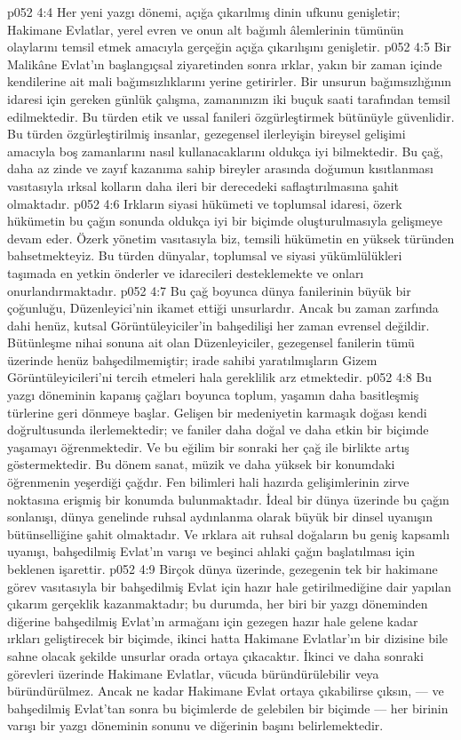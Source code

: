\vs p052 4:4 Her yeni yazgı dönemi, açığa çıkarılmış dinin ufkunu genişletir; Hakimane Evlatlar, yerel evren ve onun alt bağımlı âlemlerinin tümünün olaylarını temsil etmek amacıyla gerçeğin açığa çıkarılışını genişletir.
\vs p052 4:5 Bir Malikâne Evlat’ın başlangıçsal ziyaretinden sonra ırklar, yakın bir zaman içinde kendilerine ait mali bağımsızlıklarını yerine getirirler. Bir unsurun bağımsızlığının idaresi için gereken günlük çalışma, zamanınızın iki buçuk saati tarafından temsil edilmektedir. Bu türden etik ve ussal fanileri özgürleştirmek bütünüyle güvenlidir. Bu türden özgürleştirilmiş insanlar, gezegensel ilerleyişin bireysel gelişimi amacıyla boş zamanlarını nasıl kullanacaklarını oldukça iyi bilmektedir. Bu çağ, daha az zinde ve zayıf kazanıma sahip bireyler arasında doğumun kısıtlanması vasıtasıyla ırksal kolların daha ileri bir derecedeki saflaştırılmasına şahit olmaktadır.
\vs p052 4:6 Irkların siyasi hükümeti ve toplumsal idaresi, özerk hükümetin bu çağın sonunda oldukça iyi bir biçimde oluşturulmasıyla gelişmeye devam eder. Özerk yönetim vasıtasıyla biz, temsili hükümetin en yüksek türünden bahsetmekteyiz. Bu türden dünyalar, toplumsal ve siyasi yükümlülükleri taşımada en yetkin önderler ve idarecileri desteklemekte ve onları onurlandırmaktadır.
\vs p052 4:7 Bu çağ boyunca dünya fanilerinin büyük bir çoğunluğu, Düzenleyici’nin ikamet ettiği unsurlardır. Ancak bu zaman zarfında dahi henüz, kutsal Görüntüleyiciler’in bahşedilişi her zaman evrensel değildir. Bütünleşme nihai sonuna ait olan Düzenleyiciler, gezegensel fanilerin tümü üzerinde henüz bahşedilmemiştir; irade sahibi yaratılmışların Gizem Görüntüleyicileri’ni tercih etmeleri hala gereklilik arz etmektedir.
\vs p052 4:8 Bu yazgı döneminin kapanış çağları boyunca toplum, yaşamın daha basitleşmiş türlerine geri dönmeye başlar. Gelişen bir medeniyetin karmaşık doğası kendi doğrultusunda ilerlemektedir; ve faniler daha doğal ve daha etkin bir biçimde yaşamayı öğrenmektedir. Ve bu eğilim bir sonraki her çağ ile birlikte artış göstermektedir. Bu dönem sanat, müzik ve daha yüksek bir konumdaki öğrenmenin yeşerdiği çağdır. Fen bilimleri hali hazırda gelişimlerinin zirve noktasına erişmiş bir konumda bulunmaktadır. İdeal bir dünya üzerinde bu çağın sonlanışı, dünya genelinde ruhsal aydınlanma olarak büyük bir dinsel uyanışın bütünselliğine şahit olmaktadır. Ve ırklara ait ruhsal doğaların bu geniş kapsamlı uyanışı, bahşedilmiş Evlat’ın varışı ve beşinci ahlaki çağın başlatılması için beklenen işarettir.
\vs p052 4:9 Birçok dünya üzerinde, gezegenin tek bir hakimane görev vasıtasıyla bir bahşedilmiş Evlat için hazır hale getirilmediğine dair yapılan çıkarım gerçeklik kazanmaktadır; bu durumda, her biri bir yazgı döneminden diğerine bahşedilmiş Evlat’ın armağanı için gezegen hazır hale gelene kadar ırkları geliştirecek bir biçimde, ikinci hatta Hakimane Evlatlar’ın bir dizisine bile sahne olacak şekilde unsurlar orada ortaya çıkacaktır. İkinci ve daha sonraki görevleri üzerinde Hakimane Evlatlar, vücuda büründürülebilir veya büründürülmez. Ancak ne kadar Hakimane Evlat ortaya çıkabilirse çıksın, --- ve bahşedilmiş Evlat’tan sonra bu biçimlerde de gelebilen bir biçimde --- her birinin varışı bir yazgı döneminin sonunu ve diğerinin başını belirlemektedir.
